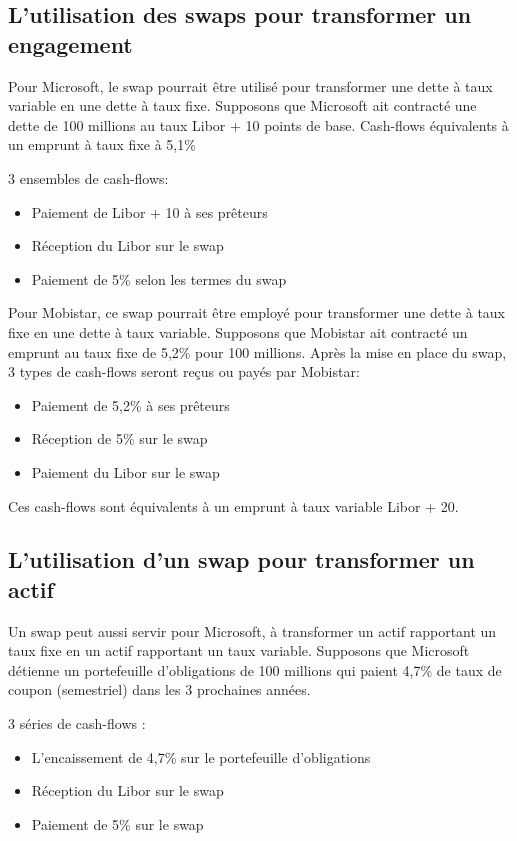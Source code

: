 	\subsection{L'utilisation des swaps pour transformer un engagement}
	
	Pour Microsoft, le swap pourrait être utilisé pour transformer une dette à 
taux variable en une dette à taux fixe.  Supposons que Microsoft ait contracté une dette de 100 millions au taux Libor + 10 points de base. Cash-flows équivalents à un emprunt à taux fixe à 5,1\% 

	3 ensembles de cash-flows: 
	\begin{itemize}
		\item Paiement de Libor + 10 à ses prêteurs 
		\item Réception du Libor sur le swap 
		\item Paiement de 5\% selon les termes du swap
	\end{itemize}

	Pour Mobistar, ce swap pourrait être employé pour transformer une dette à taux fixe en une dette à taux variable. Supposons que Mobistar ait contracté un emprunt au taux fixe de 5,2\% pour 100 millions.  Après la mise en place du swap, 3 types de cash-flows seront reçus ou payés par Mobistar: 
	\begin{itemize}
		\item Paiement de 5,2\% à ses prêteurs 
		\item Réception de 5\% sur le swap 
		\item Paiement du Libor sur le swap 
	\end{itemize}

	Ces cash-flows sont équivalents à un emprunt à taux variable Libor + 20.
	

	\subsection{L'utilisation d'un swap pour transformer un actif}

	
	Un swap peut aussi servir pour Microsoft, à transformer un actif rapportant un taux fixe en un actif rapportant un taux variable. Supposons que Microsoft détienne un portefeuille d'obligations de 100 millions qui paient 4,7\% de taux de coupon (semestriel) dans les 3 prochaines années.
	
	3 séries de cash-flows :
	
	\begin{itemize}
		\item L'encaissement de 4,7\% sur le portefeuille d'obligations 
		\item Réception du Libor sur le swap 
		\item Paiement de 5\% sur le swap 
	\end{itemize}

